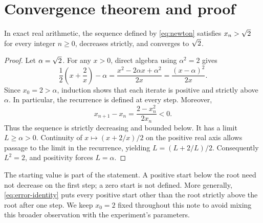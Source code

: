 \section{Convergence theorem and proof}\label{sec:convergence}
\begin{theorem}\label{thm:convergence}
In exact real arithmetic, the sequence defined by \eqref{eq:newton} satisfies
$x_n>\sqrt{2}$ for every integer $n\geq0$, decreases strictly, and converges to $\sqrt{2}$.
\end{theorem}
\begin{proof}
Let $\alpha=\sqrt{2}$. For any $x>0$, direct algebra using $\alpha^2=2$ gives
\begin{equation}\label{eq:error-identity}
\frac12\left(x+\frac{2}{x}\right)-\alpha
=\frac{x^2-2\alpha x+\alpha^2}{2x}
=\frac{(x-\alpha)^2}{2x}.
\end{equation}
Since $x_0=2>\alpha$, induction shows that each iterate is positive and strictly
above $\alpha$. In particular, the recurrence is defined at every step.
Moreover,
\[x_{n+1}-x_n=\frac{2-x_n^2}{2x_n}<0.\]
Thus the sequence is strictly decreasing and bounded below. It has a limit
$L\geq\alpha>0$. Continuity of $x\mapsto (x+2/x)/2$ on the positive real axis
allows passage to the limit in the recurrence, yielding
$L=(L+2/L)/2$. Consequently $L^2=2$, and positivity forces $L=\alpha$.
\end{proof}
The starting value is part of the statement. A positive start below the root
need not decrease on the first step; a zero start is not defined. More generally,
\eqref{eq:error-identity} puts every positive start other than the root strictly
above the root after one step. We keep $x_0=2$ fixed throughout this note to
avoid mixing this broader observation with the experiment's parameters.
